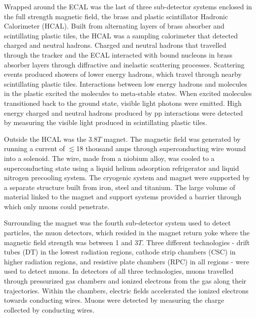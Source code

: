 Wrapped around the ECAL was the last of three sub-detector systems enclosed in the full strength magnetic field, the brass and 
plastic scintillator Hadronic Calorimeter (HCAL).  Built from alternating layers of brass absorber and scintillating
plastic tiles, the HCAL was a sampling calorimeter that detected charged and neutral hadrons.  Charged and 
neutral hadrons that travelled through the tracker and the ECAL interacted with bound nucleons in brass absorber layers
through diffractive and inelastic scattering processes.  Scattering events produced showers of lower energy hadrons, which
travel through nearby scintillating plastic tiles.  Interactions between low energy hadrons and molecules in
the plastic excited the molecules to meta-stable states.  When excited molecules transitioned back to the ground 
state, visible light photons were emitted.  High energy charged and neutral hadrons produced by pp interactions 
were detected by measuring the visible light produced in scintillating plastic tiles.

Outside the HCAL was the 3.8$\unit{T}$ magnet.  The magnetic field was generated by running a current of 
$\lesssim$18 thousand amps through superconducting wire wound into a solenoid.  The wire, made from a niobium alloy, was 
cooled to a superconducting state using a liquid helium adsorption refrigerator and liquid nitrogen precooling 
system.  The cryogenic system and magnet were supported by a separate structure built from iron, steel and titanium.  The
large volume of material linked to the magnet and support systems provided a barrier through which only muons 
could penetrate.

Surrounding the magnet was the fourth sub-detector system used to detect particles, the muon detectors, which resided 
in the magnet return yoke where the magnetic field strength was between 1 and 3$\unit{T}$.  Three 
different technologies - drift tubes (DT) in the lowest radiation regions, cathode strip chambers (CSC) in higher 
radiation regions, and resistive plate chambers (RPC) in all regions - were used to detect muons.  In detectors of all 
three technologies, muons travelled through pressurized gas chambers and ionized electrons from the gas along their 
trajectories.  Within the chambers, electric fields accelerated the ionized electrons towards conducting wires.  Muons 
were detected by measuring the charge collected by conducting wires.

